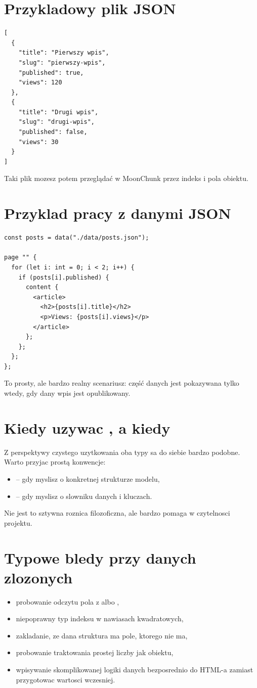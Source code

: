 \section{Przykladowy plik JSON}
\begin{lstlisting}[style=basecode,caption={Przykladowe dane posts.json}]
[
  {
    "title": "Pierwszy wpis",
    "slug": "pierwszy-wpis",
    "published": true,
    "views": 120
  },
  {
    "title": "Drugi wpis",
    "slug": "drugi-wpis",
    "published": false,
    "views": 30
  }
]
\end{lstlisting}

Taki plik mozesz potem przeglądać w MoonChunk przez indeks i pola obiektu.

\section{Przyklad pracy z danymi JSON}
\begin{lstlisting}[style=moonchunk,caption={Filtrowanie i wyswietlanie wpisow}]
const posts = data("./data/posts.json");

page "" {
  for (let i: int = 0; i < 2; i++) {
    if (posts[i].published) {
      content {
        <article>
          <h2>{posts[i].title}</h2>
          <p>Views: {posts[i].views}</p>
        </article>
      };
    };
  };
};
\end{lstlisting}

To prosty, ale bardzo realny scenariusz: część danych jest pokazywana tylko wtedy,
gdy dany wpis jest opublikowany.

\section{Kiedy uzywac , a kiedy }
Z perspektywy czystego uzytkowania oba typy sa do siebie bardzo podobne. Warto przyjac
prostą konwencje:

\begin{itemize}
  \item {} -- gdy myslisz o konkretnej strukturze modelu,
  \item {} -- gdy myslisz o slowniku danych i kluczach.
\end{itemize}

Nie jest to sztywna roznica filozoficzna, ale bardzo pomaga w czytelnosci projektu.

\section{Typowe bledy przy danych zlozonych}
\begin{itemize}
  \item probowanie odczytu pola z  albo ,
  \item niepoprawny typ indeksu w nawiasach kwadratowych,
  \item zakladanie, ze dana struktura ma pole, ktorego nie ma,
  \item probowanie traktowania prostej liczby jak obiektu,
  \item wpisywanie skomplikowanej logiki danych bezposrednio do HTML-a zamiast przygotowac wartosci wczesniej.
\end{itemize}

